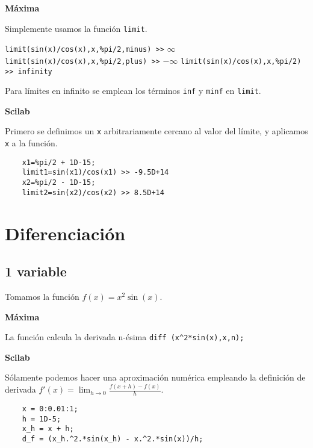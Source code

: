 \documentclass[a4paper]{article}
\begin{document}
\begin{multicols}{2}
	\begin{center}
		\textbf{Máxima}
	\end{center}

	Simplemente usamos la función \verb|limit|.

	\verb|limit(sin(x)/cos(x),x,%pi/2,minus) >>| $\infty$
	\verb|limit(sin(x)/cos(x),x,%pi/2,plus) >>| $-\infty$
	\verb|limit(sin(x)/cos(x),x,%pi/2) >> infinity|
	
	Para límites en infinito se emplean los términos \verb|inf| y \verb|minf| en \verb|limit|.
	\columnbreak
	
	
	\begin{center}
		\textbf{Scilab}
	\end{center}
	
	Primero se definimos un \verb|x| arbitrariamente cercano al valor del límite, y aplicamos \verb|x| a la función.
	\begin{verbatim}
	x1=%pi/2 + 1D-15;
	limit1=sin(x1)/cos(x1) >> -9.5D+14
	x2=%pi/2 - 1D-15;
	limit2=sin(x2)/cos(x2) >> 8.5D+14
	\end{verbatim}
	
\end{multicols}



\section{Diferenciación}
\subsection{1 variable}
Tomamos la función $f(x) = x^2\sin(x)$.
\begin{multicols}{2}
	\begin{center}
		\textbf{Máxima}
	\end{center}
	La función calcula la derivada n-ésima 
	\verb|diff (x^2*sin(x),x,n);|
	\columnbreak
	
	\begin{center}
		\textbf{Scilab}
	\end{center}
	Sólamente podemos hacer una aproximación numérica empleando la definición de derivada $f'(x) = \lim_{h\rightarrow 0} \frac{f(x+h) - f(x)}{h}$. 
	\begin{verbatim}
	x = 0:0.01:1;
	h = 1D-5;
	x_h = x + h;
	d_f = (x_h.^2.*sin(x_h) - x.^2.*sin(x))/h;
	\end{verbatim}
\end{multicols}
\end{document}
